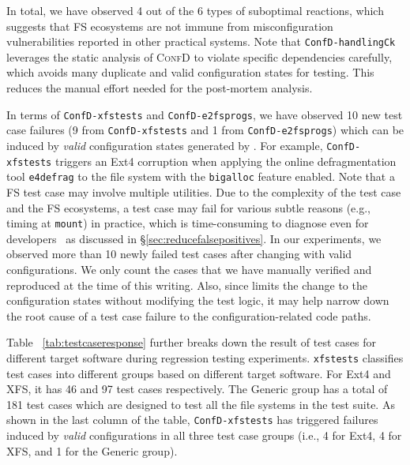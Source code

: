  In total, we have observed 4 out of the 6 types of suboptimal reactions, which suggests that FS ecosystems are not immune  from misconfiguration vulnerabilities reported in other practical systems. Note that \texttt{ConfD-handlingCk} leverages the static analysis of \textsc{ConfD} to violate specific dependencies carefully, which avoids many duplicate and valid configuration states for testing. This reduces the manual effort needed for the post-mortem analysis.    

In terms of \texttt{ConfD-xfstests} and \texttt{ConfD-e2fsprogs}, we have observed 10 new test case failures (9 from \texttt{ConfD-xfstests} and 1 from \texttt{ConfD-e2fsprogs}) which can be induced by \textit{valid} configuration states generated by \prj.
For example,  
\texttt{ConfD-xfstests} triggers an Ext4  corruption when applying the online defragmentation tool \texttt{e4defrag} to the file system with  the \texttt{bigalloc} feature enabled.
Note that a FS test case may involve multiple utilities. 
Due to the complexity of the test case and the FS ecosystems, a test case may fail for various subtle reasons (e.g., timing at \texttt{mount}) in practice, which is time-consuming to diagnose even for developers~\cite{howtofindExt4bugs} as discussed in \S\ref{sec:reducefalsepositives}. In our experiments, we observed more than 10 newly failed test cases after changing with valid configurations. 
We only count the cases that we have manually verified and reproduced at the time of this writing.
Also, since  \prj  limits the change to the configuration states without modifying the test logic, it may help narrow  down the root cause of a test case failure to the configuration-related code paths.

Table ~\ref{tab:testcaseresponse} further breaks down the result of test cases for different target software during  regression testing experiments.  \texttt{xfstests} classifies test cases into different groups based on different target software. For Ext4 and XFS, it has 46 and 97 test cases respectively. The Generic group has a total of 181 test cases which are designed to test all the file systems in the test suite. 
As shown in the last column of the table, \texttt{ConfD-xfstests} has triggered  failures induced by \textit{valid} configurations  in all three test case groups (i.e., 4 for Ext4, 4 for XFS, and 1 for the Generic group).

